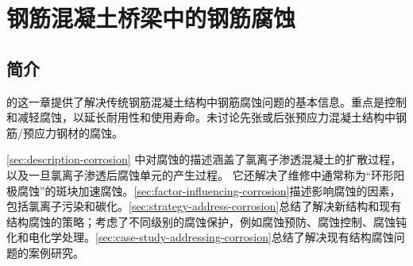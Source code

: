 \chapter{钢筋混凝土桥梁中的钢筋腐蚀}
\label{chp:corrosion-of-steel-rc-bridge}
\section{简介}
的这一章提供了解决传统钢筋混凝土结构中钢筋腐蚀问题的基本信息。重点是控制和减轻腐蚀，以延长耐用性和使用寿命。未讨论先张或后张预应力混凝土结构中钢筋/预应力钢材的腐蚀。

\cref{sec:description-corrosion} 中对腐蚀的描述涵盖了氯离子渗透混凝土的扩散过程，以及一旦氯离子渗透后腐蚀单元的产生过程。 它还解决了维修中通常称为“环形阳极腐蚀”的斑块加速腐蚀。\cref{sec:factor-influencing-corrosion}描述影响腐蚀的因素，包括氯离子污染和碳化。\cref{sec:strategy-address-corrosion}总结了解决新结构和现有结构腐蚀的策略；考虑了不同级别的腐蚀保护，例如腐蚀预防、腐蚀控制、腐蚀钝化和电化学处理。\cref{sec:case-study-addressing-corrosion}总结了解决现有结构腐蚀问题的案例研究。

